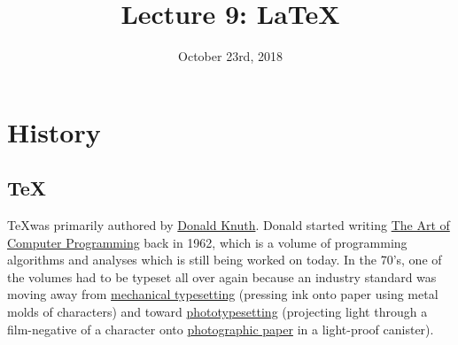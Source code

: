 \documentclass[12pt,letterpaper,twoside]{article}
\begin{document}
\title{Lecture 9: \LaTeX \vspace{-5ex}}
\date{October 23rd, 2018}
\maketitle

\vspace{-6ex}
\section{History}
\vspace{-2.5ex}
\subsection{\TeX}
\TeX was primarily authored by
\href{https://en.wikipedia.org/wiki/Donald_Knuth}{Donald
  Knuth}. Donald started writing
\href{https://en.wikipedia.org/wiki/The_Art_of_Computer_Programming}{The
  Art of Computer Programming} back in 1962, which is a volume of
programming algorithms and analyses which is still being
worked on today. In the 70's, one of the volumes had to be typeset all
over again because an industry standard was moving away from
\href{https://en.wikipedia.org/wiki/Hot_metal_typesetting}{mechanical
  typesetting} (pressing ink onto paper using metal molds of
characters) and toward
\href{https://en.wikipedia.org/wiki/Phototypesetting}{phototypesetting}
(projecting light through a film-negative of a character onto
\href{https://en.wikipedia.org/wiki/Photographic_paper}{photographic
  paper}
in a light-proof canister).
\end{document}
